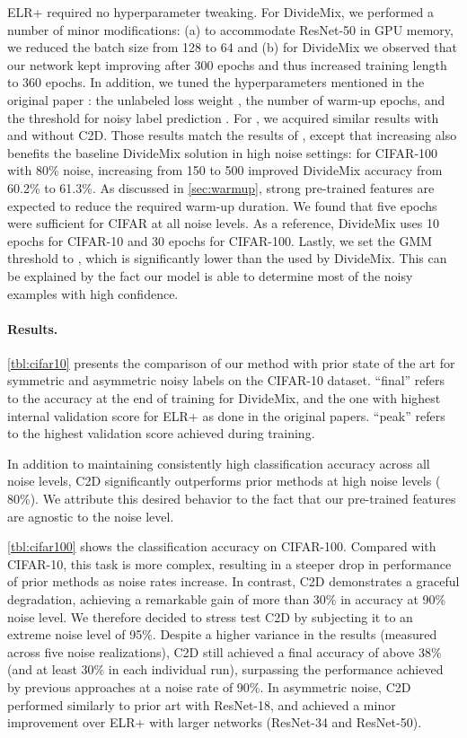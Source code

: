 \documentclass[10pt,twocolumn,letterpaper]{article}
\renewcommand{\cite}[1]{\citep{#1}}
\begin{document}
ELR+ required no hyperparameter tweaking. For DivideMix, we performed a number of minor modifications: (a) to accommodate ResNet-50 in GPU memory, we reduced the batch size from 128 to 64 and (b) for DivideMix we observed that our network kept improving after 300 epochs and thus increased training length to 360 epochs.  In addition, we tuned the hyperparameters mentioned in the original paper \cite{li2020dividemix}: the unlabeled loss weight , the number of warm-up epochs, and the threshold for noisy label prediction .
For , we acquired similar results with and without C2D. Those results match the results of \citet{li2020dividemix}, except  that increasing  also benefits the baseline DivideMix solution in high noise settings: for CIFAR-100 with 80\% noise, increasing  from 150 to 500 improved DivideMix accuracy from 60.2\% to 61.3\%. 
As discussed in \cref{sec:warmup}, strong pre-trained features are expected to reduce the required warm-up duration. We found that five epochs were sufficient for CIFAR at all noise levels. As a reference, DivideMix uses 10 epochs for CIFAR-10 and 30 epochs for CIFAR-100. Lastly, we set the GMM threshold to , which is significantly lower than the  used by DivideMix. This can be explained by the fact our model is able to determine most of the noisy examples with high confidence. 

\paragraph{Results.}
\cref{tbl:cifar10} presents the comparison of our method with prior state of the art for symmetric and asymmetric noisy labels on the CIFAR-10 dataset. 
``final'' refers to the accuracy at the end of training for DivideMix, and the one with highest internal validation score for ELR+ as done in the original papers. ``peak'' refers to the highest validation score achieved during training. 



In addition to maintaining consistently high classification accuracy across all noise levels, C2D significantly outperforms prior methods at high noise levels  ( 80\%). We attribute this desired behavior to the fact that our pre-trained features are agnostic to the noise level.  


\cref{tbl:cifar100} shows the classification accuracy on CIFAR-100. Compared with CIFAR-10, this task is more complex, resulting in a steeper drop in performance of prior methods as noise rates increase. In contrast, C2D demonstrates a graceful degradation, achieving a remarkable gain of more than 30\% in accuracy at 90\% noise level. We therefore decided to stress test C2D by subjecting it to an extreme noise level of 95\%. Despite a higher variance in the results (measured across five noise realizations), C2D still achieved a final accuracy of above 38\% (and at least 30\% in each individual run), surpassing the performance achieved by previous approaches at a noise rate of 90\%. 
In asymmetric noise, C2D performed similarly to prior art with ResNet-18, and achieved a minor improvement over ELR+ \cite{liu2020earlylearning} with larger networks (ResNet-34 and ResNet-50).
\end{document}
